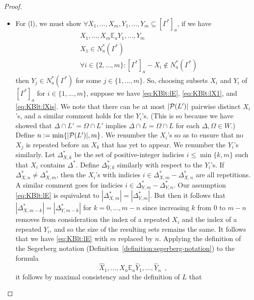 \documentclass[12pt]{article}
\theoremstyle{definition}
\newcommand{\pow}{{\cal P}}    %
\begin{document}
\begin{proof}
\begin{itemize}
  \item For (l), we must show $\forall
    X_1,\dots,X_m,Y_1,\dots,Y_m\subseteq[\Gamma^*]_a$, if we have
    \begin{eqnarray}
      &&
      X_1,\dots,X_m\mathbb{E}_aY_1,\dots,Y_m 
      \label{eq:KBlt:lE}
      \\
      &&
      X_1\in N^*_a(\Gamma^*) \enspace
      \label{eq:KBlt:lX1}            
      \\
      &&
      \forall i\in\{2,\dots,m\}:[\Gamma^*]_a-X_i\notin
      N^*_a(\Gamma^*)
      \label{eq:KBlt:lXis}
    \end{eqnarray}
    then $Y_j\in N^*_a(\Gamma^*)$ for some $j\in\{1,\dots,m\}$.  So,
    choosing subsets $X_i$ and $Y_i$ of $[\Gamma^*]_a$ for
    $i\in\{1,\dots,m\}$, suppose we have \eqref{eq:KBlt:lE},
    \eqref{eq:KBlt:lX1}, and \eqref{eq:KBlt:lXis}. We note that there
    can be at most $|\pow(L')|$ pairwise distinct $X_i$'s, and a
    similar comment holds for the $Y_i$'s.  (This is so because we
    have showed that $\Delta\cap L'=\Omega\cap L'$ implies $\Delta\cap
    L=\Omega\cap L$ for each $\Delta,\Omega\in W$.)  Define
    $n:=\min\{|\pow(L')|,m\}$.  We renumber the $X_i$'s so as to
    ensure that no $X_j$ is repeated before an $X_k$ that has yet to
    appear.  We renumber the $Y_i$'s similarly. Let $\Delta^*_{X,k}$
    be the set of positive-integer indicies $i\leq\min\{k,m\}$ such
    that $X_i$ contains $\Delta^*$.  Define $\Delta^*_{Y,k}$ similarly
    with respect to the $Y_i$'s.  If
    $\Delta^*_{X,n}\neq\Delta^*_{X,m}$, then the $X_i$'s with indicies
    $i\in \Delta^*_{X,m}-\Delta^*_{X,n}$ are all repetitions. A
    similar comment goes for indicies $i\in
    \Delta^*_{Y,m}-\Delta^*_{Y,n}$.  Our assumption \eqref{eq:KBlt:lE}
    is equivalent to $|\Delta^*_{X,m}|=|\Delta^*_{Y,m}|$.  But then it
    follows that $|\Delta^*_{X,m-k}|=|\Delta^*_{Y,m-k}|$ for
    $k=0,\dots,m-n$ since increasing $k$ from $0$ to $m-n$ removes
    from consideration the index of a repeated $X_i$ and the index of
    a repeated $Y_i$, and so the size of the resulting sets remains
    the same.  It follows that we have \eqref{eq:KBlt:lE} with $m$
    replaced by $n$.  Applying the definition of the Segerberg
    notation (Definition~\ref{definition:segerberg-notation}) to the
    formula
    \begin{equation}
      \hat X_1,\dots,\hat X_n \mathbb{E}_a \hat Y_1,\dots,\hat Y_n \enspace,
      \label{eq:KBlt:Seger}
    \end{equation}
    it follows by maximal consistency and the definition of $L$ that

\end{itemize}
\end{proof}
\end{document}
